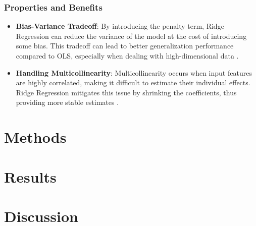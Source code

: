 \documentclass[english,11pt,a4paper,titlepage]{article}
\begin{document}
	\subsubsection*{Properties and Benefits}
	\begin{itemize}
		\item \textbf{Bias-Variance Tradeoff}: By introducing the penalty term, Ridge Regression can reduce the variance of the model at the cost of introducing some bias. This tradeoff can lead to better generalization performance compared to OLS, especially when dealing with high-dimensional data \cite{sohilIntroductionStatisticalLearning2022}.
		\item \textbf{Handling Multicollinearity}: Multicollinearity occurs when input features are highly correlated, making it difficult to estimate their individual effects. Ridge Regression mitigates this issue by shrinking the coefficients, thus providing more stable estimates \cite{hoerlRidgeRegressionBiased1970, marquardtRidgeRegressionPractice1975}.
	\end{itemize}
	
	
	
\section*{Methods}

\section*{Results}

\section*{Discussion}

\newpage
\printbibliography
\end{document}
